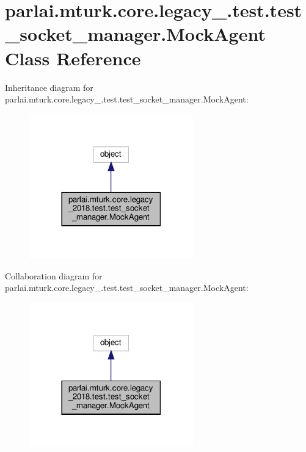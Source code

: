 \hypertarget{classparlai_1_1mturk_1_1core_1_1legacy__2018_1_1test_1_1test__socket__manager_1_1MockAgent}{}\section{parlai.\+mturk.\+core.\+legacy\+\_.\+test.\+test\+\_\+socket\+\_\+manager.\+Mock\+Agent Class Reference}
\label{classparlai_1_1mturk_1_1core_1_1legacy__2018_1_1test_1_1test__socket__manager_1_1MockAgent}


Inheritance diagram for parlai.\+mturk.\+core.\+legacy\+\_.\+test.\+test\+\_\+socket\+\_\+manager.\+Mock\+Agent\+:\nopagebreak
\begin{figure}[H]
\begin{center}
\leavevmode
\includegraphics[width=201pt]{dd/db2/classparlai_1_1mturk_1_1core_1_1legacy__2018_1_1test_1_1test__socket__manager_1_1MockAgent__inherit__graph}
\end{center}
\end{figure}


Collaboration diagram for parlai.\+mturk.\+core.\+legacy\+\_.\+test.\+test\+\_\+socket\+\_\+manager.\+Mock\+Agent\+:\nopagebreak
\begin{figure}[H]
\begin{center}
\leavevmode
\includegraphics[width=201pt]{d5/d66/classparlai_1_1mturk_1_1core_1_1legacy__2018_1_1test_1_1test__socket__manager_1_1MockAgent__coll__graph}
\end{center}
\end{figure}
